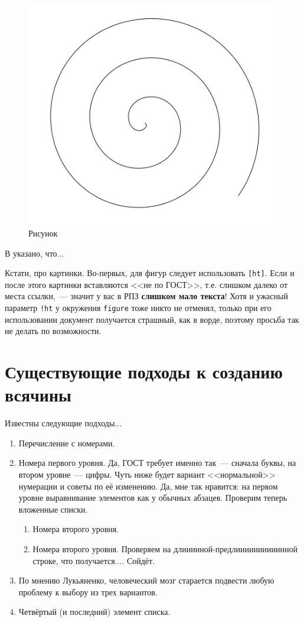 \begin{figure}
  \centering
  \includegraphics[width=\textwidth]{figures/pic01}
  \caption{Рисунок}
  \label{fig:fig01}
\end{figure}

В \cite{Pup09} указано, что...

Кстати, про картинки. Во-первых, для фигур следует использовать \texttt{[ht]}. 
Если и после этого картинки вставляются <<не по ГОСТ>>, т.е. слишком далеко от места ссылки,~--- значит у вас в РПЗ 
\textbf{слишком мало текста}! Хотя и ужасный параметр \texttt{!ht} у окружения \texttt{figure} тоже никто не отменял, 
только при его использовании документ получается страшный, как в ворде, поэтому просьба так не делать по возможности.

\section{Существующие подходы к созданию всячины}

Известны следующие подходы...

\begin{enumerate}
\item Перечисление с номерами.
\item Номера первого уровня. Да, ГОСТ требует именно так~--- сначала буквы, на втором уровне~--- цифры.
Чуть ниже будет вариант <<нормальной>> нумерации и советы по её изменению.
Да, мне так нравится: на первом уровне выравнивание элементов как у обычных абзацев. Проверим теперь вложенные списки.
\begin{enumerate}
\item Номера второго уровня.
\item Номера второго уровня. Проверяем на длииииной-предлиииииииииинной строке, что получается.... Сойдёт.
\end{enumerate}
\item По мнению Лукьяненко, человеческий мозг старается подвести любую проблему к выбору
  из трех вариантов.
\item Четвёртый (и последний) элемент списка.
\end{enumerate}


